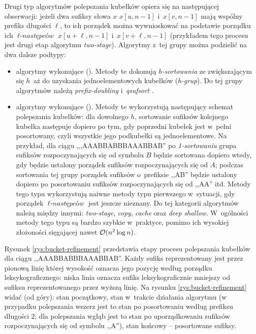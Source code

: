 Drugi typ algorytmów polepszania kubełków opiera się na następującej obserwacji: jeżeli dwa sufiksy
słowa $x$ $x[u,n-1]$ i~$x[v,n-1]$ mają wspólny prefiks długości $\ell$, to ich porządek można
wywnioskować na podstawie porządku ich $\ell\textit{-następców}$ $x[u+\ell, n-1]$ i~$x[v+\ell, n-1]$
(przykładem tego procesu jest drugi etap algorytmu \emph{two-stage}). Algorytmy z~tej grupy można
podzielić na dwa dalsze podtypy:
\begin{itemize}
	\item algorytmy wykonujące 
	(). Metody te dokonują \emph{h-sortowania}
	ze zwiększającym się $h$~aż do uzyskania jednoelementowych kubełków
	(\emph{h-grup}). Do tej grupy algorytmów należą \emph{prefix-doubling} 
	\cite{Manber90} i~\emph{qsufsort} \cite{LS}.
	
	\item algorytmy wykonujące  ().
	Metody te wykorzystują następujący schemat polepszania kubełków: dla dowolnego
	$h$, sortowanie sufiksów kolejnego kubełka następuje dopiero po tym, gdy
	poprzedni kubełek jest w~pełni posortowany, czyli wszystkie jego podkubełki są
	jednoelementowe. Na przykład, dla ciągu ,,,AAABBABBBAAABBAB'' po
	\emph{1-sortowaniu} grupa sufiksów rozpoczynających się od symbolu $B$ będzie
	sortowana dopiero wtedy, gdy będzie ustalony porządek sufiksów
	rozpoczynających się od $A$; podczas sortowania tej grupy porządek sufiksów
	o~prefiksie ,,AB'' będzie ustalony dopiero po posortowaniu sufiksów rozpoczynających się od ,,AA'' itd.
	 Metody tego typu wykorzystują naiwne metody typu pierwszego w~sytuacji, 
	 gdy porządek $\ell\textit{-następców}$ jest jeszcze nieznany.
	 Do tej kategorii algorytmów należą między innymi: \emph{two-stage}, \emph{copy},
	  \emph{cache} oraz \emph{deep shallow}. W~ogólności metody tego typu są bardzo szybkie w~praktyce, pomimo ich wysokiej złożoności sięgającej nawet $\mathcal{O}(n^2\log n)$.
\end{itemize}

Rysunek \ref{rys:bucket-refinement} przedstawia etapy procesu polepszania
kubełków dla ciągu ,,AAABBABBBAAABBAB''. Każdy sufiks reprezentowany jest przez
pionową linię której wysokość oznacza jego pozycję według porządku
leksykograficznego: niska linia oznacza sufiks leksykograficznie mniejszy od
sufiksu reprezentowanego przez wyższą linię. Na rysunku
\ref{rys:bucket-refinement} widać (od góry): stan początkowy, stan w~trakcie
działania algorytmu (w przypadku polepszania wszerz jest to stan po
posortowaniu według prefiksu długości 2; dla polepszania wgłąb jest to stan po uporządkowaniu
sufiksów rozpoczynających się od symbolu ,,A''), stan końcowy -- posortowane sufiksy.

